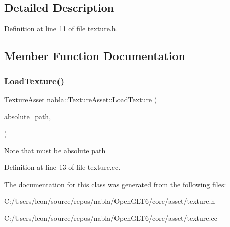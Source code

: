\subsection{Detailed Description}


Definition at line 11 of file texture.\+h.



\subsection{Member Function Documentation}
\mbox{\label{classnabla_1_1_texture_asset_af2ec4cc489f85367b405ede152a63646}} 
\subsubsection{\texorpdfstring{LoadTexture()}{LoadTexture()}}
{\footnotesize\ttfamily \mbox{\hyperlink{classnabla_1_1_texture_asset}{Texture\+Asset}} nabla\+::\+Texture\+Asset\+::\+Load\+Texture (\begin{DoxyParamCaption}\item[{const std\+::string \&}]{absolute\+\_\+path,  }\item[{Builtin\+Material}]{ }\end{DoxyParamCaption})\hspace{0.3cm}{\ttfamily [static]}}

\begin{DoxyNote}{Note}
that must be absolute path 
\end{DoxyNote}


Definition at line 13 of file texture.\+cc.



The documentation for this class was generated from the following files\+:\begin{DoxyCompactItemize}
\item 
C\+:/\+Users/leon/source/repos/nabla/\+Open\+G\+L\+T6/core/asset/texture.\+h\item 
C\+:/\+Users/leon/source/repos/nabla/\+Open\+G\+L\+T6/core/asset/texture.\+cc\end{DoxyCompactItemize}
